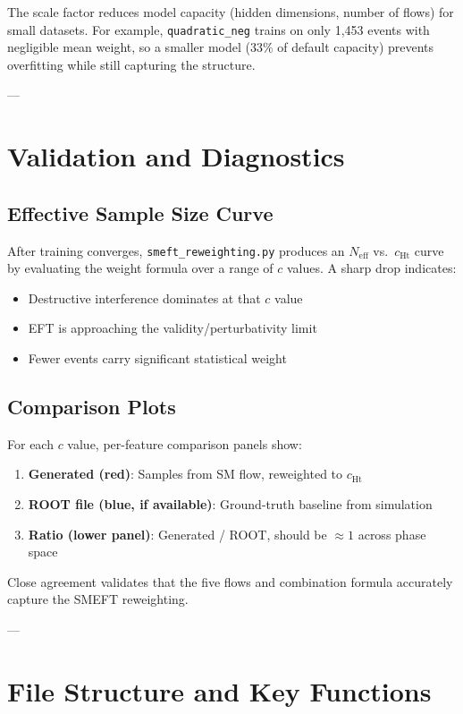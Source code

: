 \documentclass[11pt,a4paper]{article}
\begin{document}
The scale factor reduces model capacity (hidden dimensions, number of flows) for small datasets. 
For example, \texttt{quadratic\_neg} trains on only 1,453 events with negligible mean weight, so a smaller model 
($33\%$ of default capacity) prevents overfitting while still capturing the structure.

---

\section{Validation and Diagnostics}

\subsection{Effective Sample Size Curve}

After training converges, \texttt{smeft\_reweighting.py} produces an $N_{\text{eff}}$ vs.\ $c_{\text{Ht}}$ curve 
by evaluating the weight formula over a range of $c$ values. A sharp drop indicates:
\begin{itemize}
  \item Destructive interference dominates at that $c$ value
  \item EFT is approaching the validity/perturbativity limit
  \item Fewer events carry significant statistical weight
\end{itemize}

\subsection{Comparison Plots}

For each $c$ value, per-feature comparison panels show:
\begin{enumerate}
  \item \textbf{Generated (red)}: Samples from SM flow, reweighted to $c_{\text{Ht}}$
  \item \textbf{ROOT file (blue, if available)}: Ground-truth baseline from simulation
  \item \textbf{Ratio (lower panel)}: Generated / ROOT, should be $\approx 1$ across phase space
\end{enumerate}

Close agreement validates that the five flows and combination formula accurately capture 
the SMEFT reweighting.

---

\section{File Structure and Key Functions}
\end{document}

